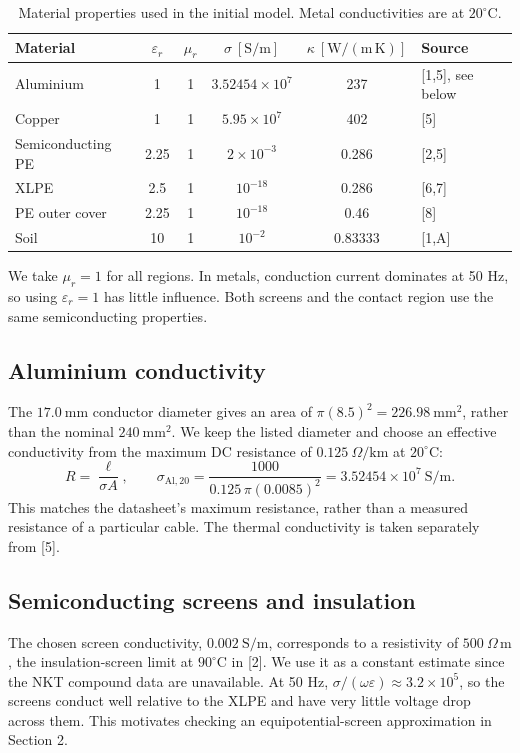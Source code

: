 \documentclass[11pt,a4paper]{article}
\begin{document}
\begin{table}[H]\centering\small
\caption{Material properties used in the initial model. Metal conductivities are at \(20^\circ\mathrm C\).}
\label{tab:materials}
\begin{tabularx}{\linewidth}{@{}Y c c c c l@{}}
\toprule
Material & \(\varepsilon_r\) & \(\mu_r\) &
\(\sigma~[\mathrm{S/m}]\) & \(\kappa~[\mathrm{W/(m\,K)}]\) & Source\\
\midrule
Aluminium & 1 & 1 & \(3.52454\times10^7\) & 237 & [1,5], see below\\
Copper & 1 & 1 & \(5.95\times10^7\) & 402 & [5]\\
Semiconducting PE & 2.25 & 1 & \(2\times10^{-3}\) & 0.286 & [2,5]\\
XLPE & 2.5 & 1 & \(10^{-18}\) & 0.286 & [6,7]\\
PE outer cover & 2.25 & 1 & \(10^{-18}\) & 0.46 & [8]\\
Soil & 10 & 1 & \(10^{-2}\) & 0.83333 & [1,A]\\
\bottomrule
\end{tabularx}
\end{table}

We take \(\mu_r=1\) for all regions. In metals, conduction current dominates
at 50 Hz, so using \(\varepsilon_r=1\) has little influence. Both screens and
the contact region use the same semiconducting properties.

\subsection*{Aluminium conductivity}
The \(17.0~\mathrm{mm}\) conductor diameter gives an area of
\(\pi(8.5)^2=226.98~\mathrm{mm^2}\), rather than the nominal
\(240~\mathrm{mm^2}\). We keep the listed diameter and choose an effective
conductivity from the maximum DC resistance of \(0.125~\Omega/\mathrm{km}\)
at \(20^\circ\mathrm C\):
\[
 R=\frac{\ell}{\sigma A},\qquad
 \sigma_{\mathrm{Al},20}
 =\frac{1000}{0.125\,\pi(0.0085)^2}
 =3.52454\times10^7~\mathrm{S/m}.
\]
This matches the datasheet's maximum resistance, rather than a measured
resistance of a particular cable. The thermal conductivity is taken
separately from [5].

\subsection*{Semiconducting screens and insulation}
The chosen screen conductivity, \(0.002~\mathrm{S/m}\), corresponds to a
resistivity of \(500~\Omega\,\mathrm m\), the insulation-screen limit at
\(90^\circ\mathrm C\) in [2]. We use it as a constant estimate since the
NKT compound data are unavailable. At 50 Hz,
\(\sigma/(\omega\varepsilon)\approx3.2\times10^5\), so the screens conduct
well relative to the XLPE and have very little voltage drop across them.
This motivates checking an equipotential-screen approximation in Section 2.
\end{document}
